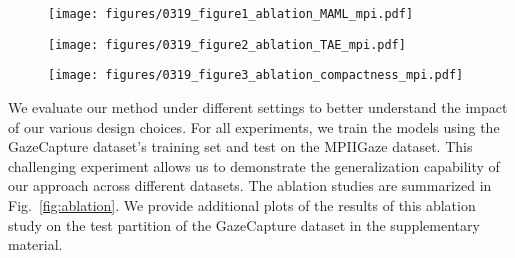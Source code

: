 \documentclass[10pt,twocolumn,letterpaper]{article}
\begin{document}
\begin{figure*}
    \centering
    \begin{subfigure}[b]{0.33\textwidth}
        \texttt{[image: figures/0319\_figure1\_ablation\_MAML\_mpi.pdf]}
        \vskip -1mm
        \caption{\vspace{-3mm}}
        \label{fig:maml-vs-nomaml}
    \end{subfigure}
    \hfill
    \begin{subfigure}[b]{0.33\textwidth}
        \texttt{[image: figures/0319\_figure2\_ablation\_TAE\_mpi.pdf]}
        \vskip -1mm
        \caption{\vspace{-3mm}}
        \label{fig:impact_of_loss_terms}
    \end{subfigure}
    \begin{subfigure}[b]{0.33\textwidth}
        \texttt{[image: figures/0319\_figure3\_ablation\_compactness\_mpi.pdf]}
        \vskip -1mm
        \caption{\vspace{-3mm}}
        \label{fig:impact_of_embedding consistency}
    \end{subfigure}
    \caption{\textbf{Ablation Study:} Impact of (a) learning the few-shot gaze estimator using MAML (Sec.~\ref{sec:MAML}) and using the transforming encoder-decoder for feature learning (Sec.~\ref{sec:RotAE}); (b) different loss terms in Eq. \eqref{eq:loss} for training the transforming encoder-decoder; and (c) comparison of the different variants of embedding consistency loss term (Eq. \eqref{eq:embedding consistency_loss}). 
    We provide additional results for the test partition of the GazeCapture dataset in the supplementary material. 
    \vspace{-5mm}
    }
    \label{fig:ablation}
\end{figure*}


We evaluate our method under different settings to better understand the impact of our various design choices. For all experiments, we train the models using the GazeCapture dataset's training set and test on the MPIIGaze dataset. This challenging experiment allows us to demonstrate the generalization capability of our approach across different datasets. The ablation studies are summarized in Fig.~\ref{fig:ablation}. We provide additional plots of the results of this ablation study on the test partition of the GazeCapture dataset in the supplementary material.
\end{document}
